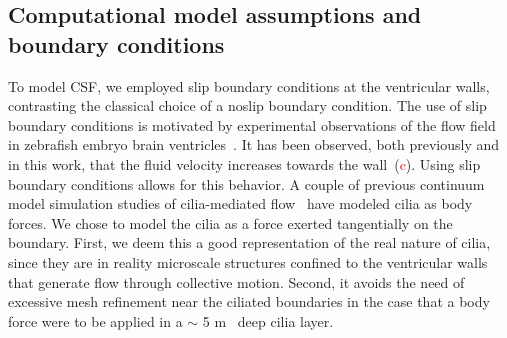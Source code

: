 \documentclass[fleqn]{wlscirep}
\newcommand{\fixme}[1]{\textcolor{red}{#1}}
\begin{document}
\subsection*{Computational model assumptions and boundary conditions}
To model CSF, we employed slip boundary conditions at the ventricular walls,
contrasting the classical choice of a noslip boundary condition.
The use of slip boundary conditions is motivated by experimental observations of the
flow field in zebrafish embryo brain ventricles~\cite{Olstad2019CiliaryDevelopment}.
It has been observed, both previously and in this work, that the fluid velocity increases
towards the wall~(\fixme{c}).
Using slip boundary conditions allows for this behavior.
A couple of previous continuum model simulation studies of
cilia-mediated flow~\cite{Siyahhan2014FlowVentricles, Thouvenin2020OriginCanal}
have modeled cilia as body forces. We chose to model the cilia as a force exerted tangentially on the boundary.
First, we deem this a good representation of the real nature of cilia,
since they are in reality microscale structures confined to the ventricular walls that
generate flow through collective motion. Second, it avoids the need of excessive mesh
refinement near the ciliated boundaries in the case that a
body force were to be applied in a $\sim$ 5 \textmu m~\cite{Salman2022ComputationalEmbryo} deep cilia layer.
\end{document}
